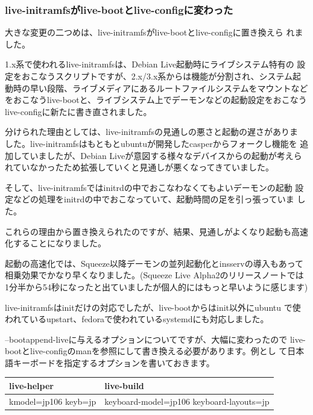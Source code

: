 \documentclass[mingoth,a4paper]{jsarticle}
\begin{document}
\subsubsection{live-initramfsがlive-bootとlive-configに変わった}

大きな変更の二つめは、live-initramfsがlive-bootとlive-configに置き換えら
れました。

1.x系で使われるlive-initramfsは、Debian Live起動時にライブシステム特有の
設定をおこなうスクリプトですが、2.x/3.x系からは機能が分割され、システム起
動時の早い段階、ライブメディアにあるルートファイルシステムをマウントなど
をおこなうlive-bootと、ライブシステム上でデーモンなどの起動設定をおこなう
live-configに新たに書き直されました。

分けられた理由としては、live-initramfsの見通しの悪さと起動の遅さがありま
した。live-initramfsはもともとubuntuが開発したcasperからフォークし機能を
追加していましたが、Debian Liveが意図する様々なデバイスからの起動が考えら
れていなかったため拡張していくと見通しが悪くなってきていました。

そして、live-initramfsではinitrdの中でおこなわなくてもよいデーモンの起動
設定などの処理をinitrdの中でおこなっていて、起動時間の足を引っ張っていま
した。

これらの理由から置き換えられたのですが、結果、見通しがよくなり起動も高速
化することになりました。

起動の高速化では、Squeeze以降デーモンの並列起動化とinsservの導入もあって
相乗効果でかなり早くなりました。(Squeeze Live Alpha2のリリースノートでは
1分半から54秒になったと出ていましたが個人的にはもっと早いように感じます)

live-initramfsはinitだけの対応でしたが、live-bootからはinit以外にubuntu
で使われているupstart、fedoraで使われているsystemdにも対応しました。

--bootappend-liveに与えるオプションについてですが、大幅に変わったので
  live-bootとlive-configのmanを参照にして書き換える必要があります。例とし
  て日本語キーボードを指定するオプションを書いておきます。

\begin{table}[h]
\begin{center}
 \begin{tabular}{|l|l|}
 \hline
 live-helper & live-build \\
 \hline
 \hline
  kmodel=jp106 keyb=jp &
  keyboard-model=jp106 keyboard-layouts=jp \\
 \hline
 \end{tabular}
\end{center}
\end{table}
\end{document}
